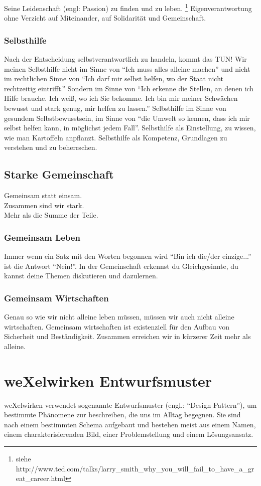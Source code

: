 Seine Leidenschaft (engl: Passion) zu finden und zu leben. \footnote{siehe http://www.ted.com/talks/larry\_smith\_why\_you\_will\_fail\_to\_have\_a\_great\_career.html} 
%
Eigenverantwortung ohne Verzicht auf Miteinander, auf Solidarität und Gemeinschaft.
%

      \subsubsection{Selbsthilfe}
Nach der Entscheidung selbstverantwortlich zu handeln, kommt das TUN!
Wir meinen Selbsthilfe nicht im Sinne von "`Ich muss alles alleine machen"' und nicht im rechtlichen Sinne von "`Ich darf mir selbst helfen, wo der Staat nicht rechtzeitig eintrifft."'
%
Sondern im Sinne von "`Ich erkenne die Stellen, an denen ich Hilfe brauche.
%
Ich weiß, wo ich Sie bekomme.
%
Ich bin mir meiner Schwächen bewusst und stark genug, mir helfen zu lassen."'
%
Selbsthilfe im Sinne von gesundem Selbstbewusstsein, im Sinne von "`die Umwelt so kennen, dass ich mir selbst helfen kann, in möglichst jedem Fall"'.
%
Selbsthilfe als Einstellung, zu wissen, wie man Kartoffeln anpflanzt.
%
Selbsthilfe als Kompetenz, Grundlagen zu verstehen und zu beherrschen.

    \subsection{Starke Gemeinschaft}
Gemeinsam statt einsam.\\
Zusammen sind wir stark.\\
Mehr als die Summe der Teile.\\
      \subsubsection{Gemeinsam Leben}
Immer wenn ein Satz mit den Worten begonnen wird "`Bin ich die/der einzige..."' ist die Antwort "`Nein!"'.
%
In der Gemeinschaft erkennst du Gleichgesinnte, du kannst deine Themen diskutieren und dazulernen.
      \subsubsection{Gemeinsam Wirtschaften}
Genau so wie wir nicht alleine leben müssen, müssen wir auch nicht alleine wirtschaften.
%
Gemeinsam wirtschaften ist existenziell für den Aufbau von Sicherheit und Beständigkeit.
%
Zusammen erreichen wir in kürzerer Zeit mehr als alleine.
  \section{weXelwirken Entwurfsmuster}
weXelwirken  verwendet  sogenannte  Entwurfsmuster (engl.:  "`Design  Pattern"'),  um  bestimmte Phänomene zur beschreiben, die uns im Alltag begegnen.
%
Sie sind nach einem bestimmten Schema aufgebaut  und  bestehen  meist  aus  einem  Namen,  einem  charakterisierenden  Bild,  einer Problemstellung und einem Lösungsansatz.



